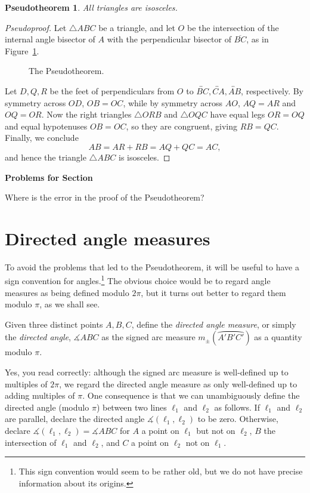\documentclass[12pt]{book}
\newcounter{exc}
\numberwithin{exc}{section}
\numberwithin{figure}{section}
\newenvironment{exer}{\vspace{0.1in}
\noindent \textbf{Problems for Section~\thesection} \vspace{0.1in}
\begin{list}{\arabic{exc}.}{\usecounter{exc}}}{\end{list}}
\numberwithin{equation}{theorem}
\def\ii{\item}
\def\dang{\measuredangle} %
\def\line#1{\overleftrightarrow{#1}}
\def\seg#1{\overline{#1}}
\def\arc#1{\wideparen{#1}}
\begin{document}
\newtheorem*{pseudo}{Pseudotheorem}
\begin{pseudo}
All triangles are isosceles.
\end{pseudo}
\begin{proof}[Pseudoproof]
Let $\triangle ABC$ be a triangle, and let $O$ be the intersection of the 
internal angle bisector of $A$ with the perpendicular bisector of $\seg{BC}$,
as in Figure~\ref{fig:pseudothm}.
\begin{figure}[ht]
\caption{The Pseudotheorem.} 
\label{fig:pseudothm}
\end{figure}

Let $D, Q, R$ be the feet of perpendiculars from $O$ to $\line{BC}, \line{CA}, 
\line{AB}$, 
respectively. By symmetry across $OD$, $OB = OC$, while by symmetry 
across $AO$, $AQ = AR$ and $OQ = OR$. Now the right triangles $\triangle ORB$ 
and $\triangle OQC$ have equal legs $OR = OQ$ and equal hypotenuses $OB = OC$, 
so they are congruent, giving $RB = QC$. Finally, we conclude
\[
AB = AR + RB = AQ + QC = AC,
\]
and hence the triangle $\triangle ABC$ is isosceles.
\end{proof}

\begin{exer}
\ii
Where is the error in the proof of the Pseudotheorem?
\end{exer}

\section{Directed angle measures}
\label{sec:directed}

To avoid the problems that led to the Pseudotheorem, it will be useful to
have a sign convention for angles.\footnote{This sign convention would seem to be rather old, but we do not have precise information about its origins.}
The obvious choice would be to regard angle measures as being defined
modulo $2\pi$, but it turns out better to regard them modulo $\pi$, as we
shall see.

Given three distinct points $A,B,C$, define the \emph{directed angle measure},
or simply the \emph{directed angle},
$\dang ABC$ as the signed arc measure $m_{\pm}(\arc{A'B'C'})$ as a
quantity modulo $\pi$.

Yes, you read correctly: although the signed arc
measure is well-defined up to multiples of $2\pi$, we regard the directed
angle measure as only well-defined up to adding multiples of $\pi$.
One consequence is that we can unambiguously
define the directed angle (modulo $\pi$)
between two lines $\ell_1$ and $\ell_2$ as follows.
If $\ell_1$ and $\ell_2$ are parallel, declare the directed angle
$\dang(\ell_1,\ell_2)$ to be zero. Otherwise, declare
$\dang(\ell_1,\ell_2) = \dang ABC$ for $A$ a point on $\ell_1$ but not
on $\ell_2$, $B$ the intersection of $\ell_1$ and $\ell_2$, and
$C$ a point on $\ell_2$ not on $\ell_1$.
\end{document}
